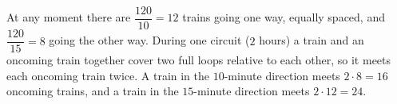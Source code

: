 At any moment there are $\dfrac{120}{10}=12$ trains going one way, equally spaced, and $\dfrac{120}{15}=8$ going the other way. During one circuit ($2$ hours) a train and an oncoming train together cover two full loops relative to each other, so it meets each oncoming train twice. A train in the $10$-minute direction meets $2\cdot8=\boxed{16}$ oncoming trains, and a train in the $15$-minute direction meets $2\cdot12=\boxed{24}$.
